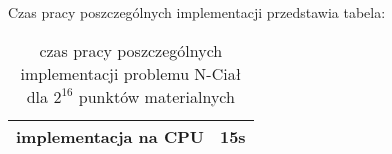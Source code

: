 
Czas pracy poszczególnych implementacji przedstawia tabela:
\begin{table}
\caption{ czas pracy poszczególnych implementacji problemu N-Ciał dla $2^{16}$ punktów materialnych }
\label{wyniki}
\begin{tabular}{ |r|l| }
 \hline
 implementacja na CPU & 15s \\
 \hline
\end{tabular}

\end{table}
 